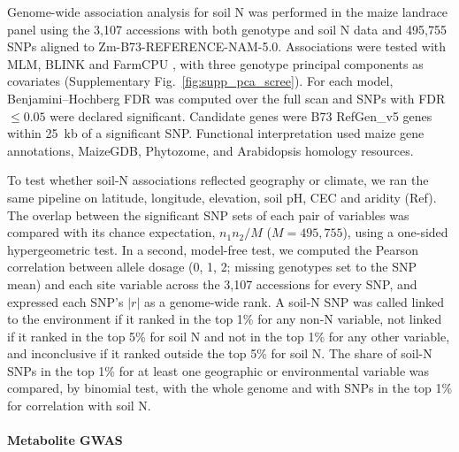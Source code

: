 Genome-wide association analysis for soil N was performed in the maize landrace panel \citep{RomeroNavarro2017Landraces} using the 3,107 accessions with both genotype and soil N data and 495,755 SNPs aligned to Zm-B73-REFERENCE-NAM-5.0. Associations were tested with MLM, BLINK and FarmCPU \citep{Slaten2020HAPPI}, with three genotype principal components as covariates (Supplementary Fig.~\ref{fig:supp_pca_scree}). For each model, Benjamini--Hochberg FDR was computed over the full scan and SNPs with FDR $\leq 0.05$ were declared significant. Candidate genes were B73 RefGen\_v5 genes within 25~kb of a significant SNP. Functional interpretation used maize gene annotations, MaizeGDB, Phytozome, and Arabidopsis homology resources.

To test whether soil-N associations reflected geography or climate, we ran the same pipeline on latitude, longitude, elevation, soil pH, CEC and aridity (Ref). The overlap between the significant SNP sets of each pair of variables was compared with its chance expectation, $n_1 n_2 / M$ ($M = 495{,}755$), using a one-sided hypergeometric test. In a second, model-free test, we computed the Pearson correlation between allele dosage (0, 1, 2; missing genotypes set to the SNP mean) and each site variable across the 3,107 accessions for every SNP, and expressed each SNP's $|r|$ as a genome-wide rank. A soil-N SNP was called linked to the environment if it ranked in the top 1\% for any non-N variable, not linked if it ranked in the top 5\% for soil N and not in the top 1\% for any other variable, and inconclusive if it ranked outside the top 5\% for soil N. The share of soil-N SNPs in the top 1\% for at least one geographic or environmental variable was compared, by binomial test, with the whole genome and with SNPs in the top 1\% for correlation with soil N.

\paragraph{Metabolite GWAS}

